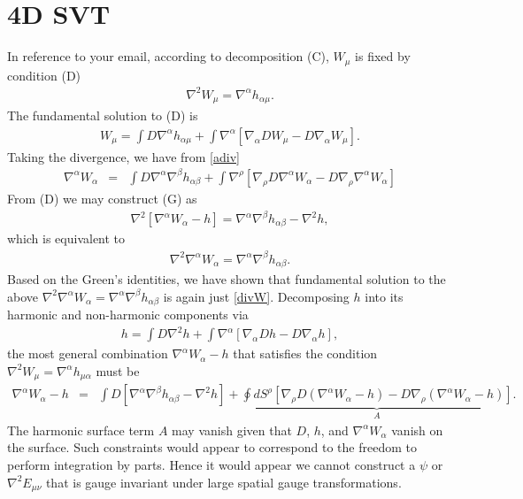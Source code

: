\documentclass[10pt,letterpaper]{article}
\begin{document}
\section*{4D SVT}
In reference to your email, according to decomposition (C), $W_\mu$ is fixed by condition (D)
\begin{eqnarray}
\nabla^2 W_\mu = \nabla^\alpha h_{\alpha\mu}. 
\end{eqnarray}
The fundamental solution to (D) is
\begin{eqnarray}
W_\mu = \int D \nabla^\alpha h_{\alpha\mu} + \int \nabla^\alpha[\nabla_\alpha D W_\mu - D\nabla_\alpha W_\mu].
\label{Wfun}
\end{eqnarray}
Taking the divergence, we have from \eqref{adiv} 
\begin{eqnarray}
\nabla^\alpha W_\alpha &=& \int D \nabla^\alpha\nabla^\beta h_{\alpha\beta} + \int \nabla^\rho[ \nabla_\rho D \nabla^\alpha W_\alpha - D\nabla_\rho \nabla^\alpha W_\alpha]
\label{divW}
\end{eqnarray}
From (D) we may construct (G) as
\begin{eqnarray}
\nabla^2[\nabla^\alpha W_\alpha - h] = \nabla^\alpha\nabla^\beta h_{\alpha\beta} - \nabla^2 h,
\end{eqnarray}
which is equivalent to
\begin{eqnarray}
\nabla^2 \nabla^\alpha W_\alpha = \nabla^\alpha\nabla^\beta h_{\alpha\beta}.
\label{G2}
\end{eqnarray}
Based on the Green's identities, we have shown that fundamental solution to the above $\nabla^2 \nabla^\alpha W_\alpha = \nabla^\alpha\nabla^\beta h_{\alpha\beta}$ is again just \eqref{divW}. Decomposing $h$ into its harmonic and non-harmonic components via
\begin{eqnarray}
h = \int D \nabla^2 h + \int \nabla^\alpha [\nabla_\alpha D h - D\nabla_\alpha h],
\end{eqnarray}
the most general combination $\nabla^\alpha W_\alpha - h$ that satisfies the condition $\nabla^2 W_\mu = \nabla^\alpha h_{\mu\alpha}$
must be
\begin{eqnarray}
\nabla^\alpha W_\alpha - h &=& \int D [ \nabla^\alpha\nabla^\beta h_{\alpha\beta} -\nabla^2 h] + \underbrace{\oint dS^\rho[ \nabla_\rho D(\nabla^\alpha W_\alpha - h) - D \nabla_\rho (\nabla^\alpha W_\alpha - h)]}_{A}.
\end{eqnarray}
The harmonic surface term $A$ may vanish given that $D$, $h$, and $\nabla^\alpha W_\alpha$ vanish on the surface. Such constraints would appear to correspond to the freedom to perform integration by parts. Hence it would appear we cannot construct a $\psi$ or $\nabla^2 E_{\mu\nu}$ that is gauge invariant under large spatial gauge transformations.
\end{document}
